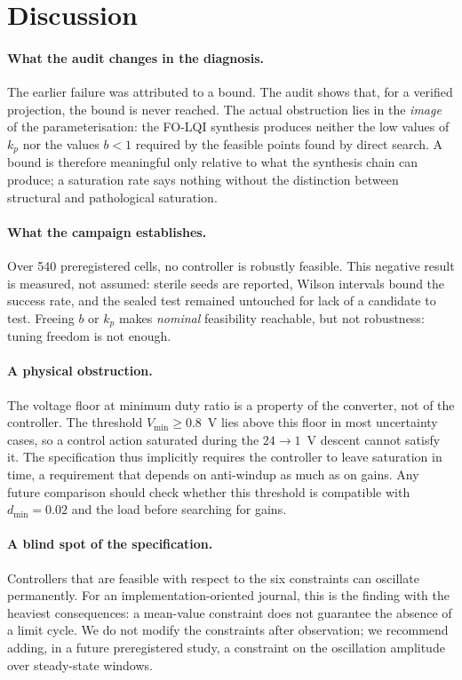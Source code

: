\section{Discussion}
\label{sec:discussion}

\paragraph{What the audit changes in the diagnosis.}
The earlier failure was attributed to a bound. The audit shows that, for a
verified projection, the bound is never reached. The actual obstruction lies
in the \emph{image} of the parameterisation: the FO-LQI synthesis produces
neither the low values of $k_p$ nor the values $b<1$ required by the feasible
points found by direct search. A bound is therefore meaningful only relative
to what the synthesis chain can produce; a saturation rate says nothing
without the distinction between structural and pathological saturation.

\paragraph{What the campaign establishes.}
Over 540 preregistered cells, no controller is robustly feasible. This
negative result is measured, not assumed: sterile seeds are reported, Wilson
intervals bound the success rate, and the sealed test remained untouched for
lack of a candidate to test. Freeing $b$ or $k_p$ makes \emph{nominal}
feasibility reachable, but not robustness: tuning freedom is not enough.

\paragraph{A physical obstruction.}
The voltage floor at minimum duty ratio is a property of the converter, not of
the controller. The threshold $V_\mathrm{min}\ge0.8$~V lies above this floor
in most uncertainty cases, so a control action saturated during the
$24\to1$~V descent cannot satisfy it. The specification thus implicitly
requires the controller to leave saturation in time, a requirement that
depends on anti-windup as much as on gains. Any future comparison should check
whether this threshold is compatible with $d_\mathrm{min}=0.02$ and the load
before searching for gains.

\paragraph{A blind spot of the specification.}
Controllers that are feasible with respect to the six constraints can
oscillate permanently. For an implementation-oriented journal, this is the
finding with the heaviest consequences: a mean-value constraint does not
guarantee the absence of a limit cycle. We do not modify the constraints after
observation; we recommend adding, in a future preregistered study, a
constraint on the oscillation amplitude over steady-state windows.

